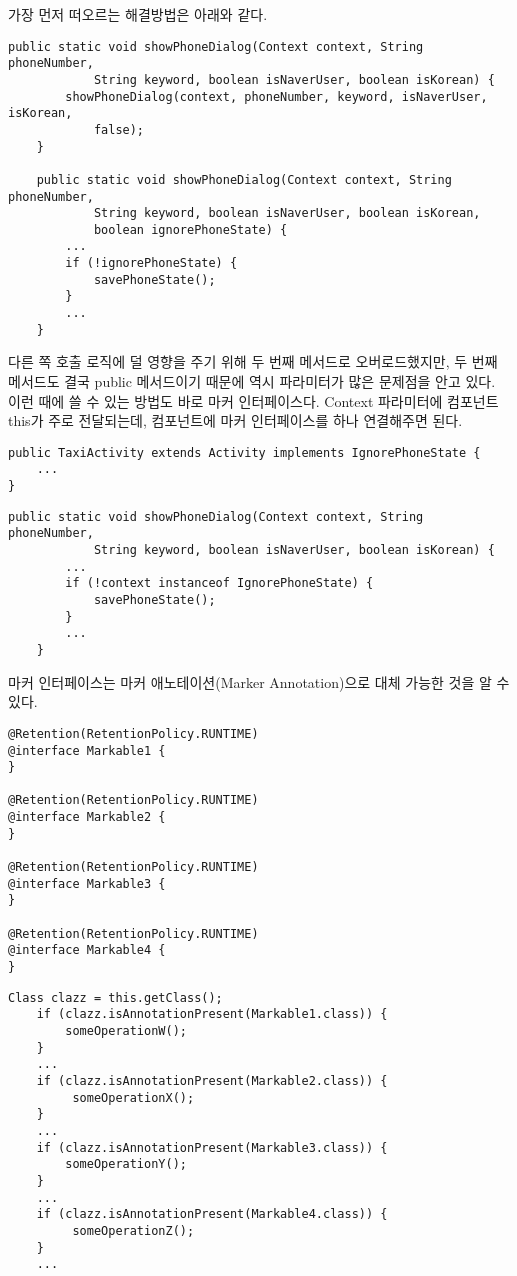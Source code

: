 가장 먼저 떠오르는 해결방법은 아래와 같다.
\begin{lstlisting}[frame=single]
	public static void showPhoneDialog(Context context, String phoneNumber, 
			String keyword, boolean isNaverUser, boolean isKorean) {
		showPhoneDialog(context, phoneNumber, keyword, isNaverUser, isKorean, 
			false);
	}

	public static void showPhoneDialog(Context context, String phoneNumber, 
			String keyword, boolean isNaverUser, boolean isKorean, 
			boolean ignorePhoneState) {
		...
		if (!ignorePhoneState) {
			savePhoneState();
		}
		...
	}
\end{lstlisting}
다른 쪽 호출 로직에 덜 영향을 주기 위해 두 번째 메서드로 오버로드했지만, 두 번째 메서드도 결국 public 메서드이기 때문에 역시 파라미터가 많은 문제점을 안고 있다.
이런 때에 쓸 수 있는 방법도 바로 마커 인터페이스다. Context 파라미터에 컴포넌트 this가 주로 전달되는데, 컴포넌트에 마커 인터페이스를 하나 연결해주면 된다.

\begin{lstlisting}[frame=single]
public TaxiActivity extends Activity implements IgnorePhoneState {
	...
}
\end{lstlisting}

\begin{lstlisting}[frame=single]
	public static void showPhoneDialog(Context context, String phoneNumber, 
			String keyword, boolean isNaverUser, boolean isKorean) {
		...
		if (!context instanceof IgnorePhoneState) {
			savePhoneState();
		}
		...
	}
\end{lstlisting}	
	
마커 인터페이스는 마커 애노테이션(Marker Annotation)으로 대체 가능한 것을 알 수 있다.

\begin{lstlisting}[frame=single]
@Retention(RetentionPolicy.RUNTIME)
@interface Markable1 {
}

@Retention(RetentionPolicy.RUNTIME)
@interface Markable2 {
}

@Retention(RetentionPolicy.RUNTIME)
@interface Markable3 {
}

@Retention(RetentionPolicy.RUNTIME)
@interface Markable4 {
}
\end{lstlisting}

\begin{lstlisting}[frame=single]
	Class clazz = this.getClass();
	if (clazz.isAnnotationPresent(Markable1.class)) {
		someOperationW();	
	}
 	...
	if (clazz.isAnnotationPresent(Markable2.class)) {
		 someOperationX();
	}
	...
	if (clazz.isAnnotationPresent(Markable3.class)) {
		someOperationY();
	} 
	...
	if (clazz.isAnnotationPresent(Markable4.class)) {
		 someOperationZ();
	}
	...
\end{lstlisting}


